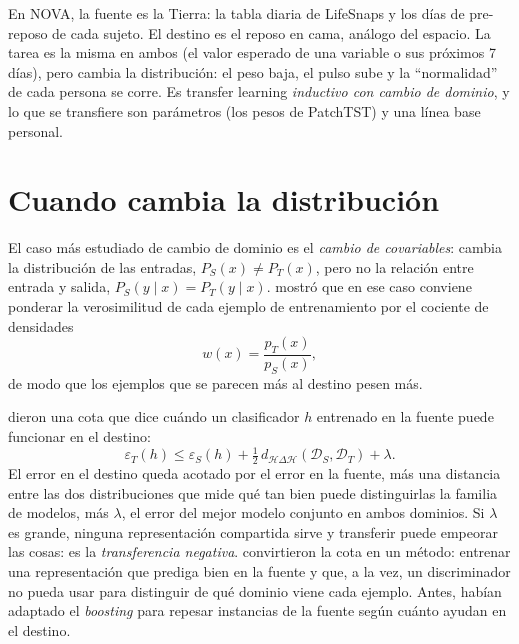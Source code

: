 \begin{clave}
En NOVA, la fuente es la Tierra: la tabla diaria de LifeSnaps y los días de pre-reposo de cada sujeto. El destino es el
reposo en cama, análogo del espacio. La tarea es la misma en ambos (el valor esperado de una variable o sus próximos 7
días), pero cambia la distribución: el peso baja, el pulso sube y la \enquote{normalidad} de cada persona se corre. Es
transfer learning \emph{inductivo con cambio de dominio}, y lo que se transfiere son parámetros (los pesos de PatchTST)
y una línea base personal.
\end{clave}

\section{Cuando cambia la distribución}

El caso más estudiado de cambio de dominio es el \emph{cambio de covariables}: cambia la distribución de las entradas,
$P_S(x) \neq P_T(x)$, pero no la relación entre entrada y salida, $P_S(y \mid x) = P_T(y \mid x)$.
\textcite{shimodaira2000} mostró que en ese caso conviene ponderar la verosimilitud de cada ejemplo de entrenamiento
por el cociente de densidades
\begin{equation}
w(x) = \frac{p_T(x)}{p_S(x)},
\end{equation}
de modo que los ejemplos que se parecen más al destino pesen más.

\textcite{bendavid2010} dieron una cota que dice cuándo un clasificador $h$ entrenado en la fuente puede funcionar en
el destino:
\begin{equation}\label{eq:bendavid}
\varepsilon_T(h) \le \varepsilon_S(h) + \tfrac{1}{2}\, d_{\mathcal{H}\Delta\mathcal{H}}(\mathcal{D}_S, \mathcal{D}_T)
  + \lambda .
\end{equation}
El error en el destino queda acotado por el error en la fuente, más una distancia entre las dos distribuciones que
mide qué tan bien puede distinguirlas la familia de modelos, más $\lambda$, el error del mejor modelo conjunto en
ambos dominios. Si $\lambda$ es grande, ninguna representación compartida sirve y transferir puede empeorar las cosas:
es la \emph{transferencia negativa}. \textcite{ganin2016} convirtieron la cota en un método: entrenar una
representación que prediga bien en la fuente y que, a la vez, un discriminador no pueda usar para distinguir de qué
dominio viene cada ejemplo. Antes, \textcite{dai2007} habían adaptado el \emph{boosting} para repesar instancias de la
fuente según cuánto ayudan en el destino.

